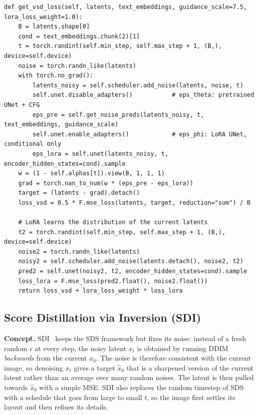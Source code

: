 \begin{lstlisting}
def get_vsd_loss(self, latents, text_embeddings, guidance_scale=7.5, lora_loss_weight=1.0):
    B = latents.shape[0]
    cond = text_embeddings.chunk(2)[1]
    t = torch.randint(self.min_step, self.max_step + 1, (B,), device=self.device)
    noise = torch.randn_like(latents)
    with torch.no_grad():
        latents_noisy = self.scheduler.add_noise(latents, noise, t)
        self.unet.disable_adapters()           # eps_theta: pretrained UNet + CFG
        eps_pre = self.get_noise_preds(latents_noisy, t, text_embeddings, guidance_scale)
        self.unet.enable_adapters()            # eps_phi: LoRA UNet, conditional only
        eps_lora = self.unet(latents_noisy, t, encoder_hidden_states=cond).sample
    w = (1 - self.alphas[t]).view(B, 1, 1, 1)
    grad = torch.nan_to_num(w * (eps_pre - eps_lora))
    target = (latents - grad).detach()
    loss_vsd = 0.5 * F.mse_loss(latents, target, reduction="sum") / B

    # LoRA learns the distribution of the current latents
    t2 = torch.randint(self.min_step, self.max_step + 1, (B,), device=self.device)
    noise2 = torch.randn_like(latents)
    noisy2 = self.scheduler.add_noise(latents.detach(), noise2, t2)
    pred2 = self.unet(noisy2, t2, encoder_hidden_states=cond).sample
    loss_lora = F.mse_loss(pred2.float(), noise2.float())
    return loss_vsd + lora_loss_weight * loss_lora
\end{lstlisting}

\subsection{Score Distillation via Inversion (SDI)}
\label{sec:sdi}

\noindent\textbf{Concept.}
SDI~\cite{lukoianov2024sdi} keeps the SDS framework but fixes its noise: instead of a fresh random $\epsilon$ at every step, the noisy latent $x_t$ is obtained by running DDIM~\cite{song2021ddim} \emph{backwards} from the current $x_0$.
The noise is therefore consistent with the current image, so denoising $x_t$ gives a target $\hat x_0$ that is a sharpened version of the current latent rather than an average over many random noises.
The latent is then pulled towards $\hat x_0$ with a simple MSE.
SDI also replaces the random timestep of SDS with a schedule that goes from large to small $t$, so the image first settles its layout and then refines its details.

